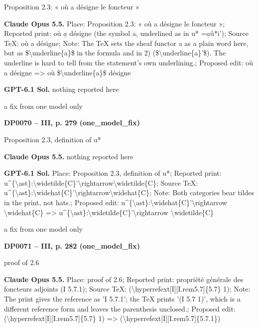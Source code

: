 Proposition 2.3: « où a désigne le foncteur »\par
\textbf{Claude Opus 5.5.} Place: Proposition 2.3: « où a désigne le foncteur »; Reported print: où \ensuremath{\underline{a}} désigne (the symbol a, underlined as in u* =\allowbreak  \ensuremath{\underline{a}}û*i'); Source TeX: où a désigne; Note: The TeX sets the sheaf functor a as a plain word here, but as \$\textbackslash{}underline\{a\}\$ in the formula and in 2) (\$\textbackslash{}underline\{a\}'\$). The underline is hard to tell from the statement's own underlining.; Proposed edit: où a désigne =\allowbreak > où \$\textbackslash{}underline\{a\}\$ désigne\par
\textbf{GPT-6.1 Sol.} nothing reported here\par
a fix from one model only\par
\par\noindent\hypertarget{DP0070}{}\textbf{DP0070 -- III, p. 279 (one\_model\_fix)}\par
Proposition 2.3, definition of u*\par
\textbf{Claude Opus 5.5.} nothing reported here\par
\textbf{GPT-6.1 Sol.} Place: Proposition 2.3, definition of u*; Reported print: u\textasciicircum{}\{\textbackslash{}ast\}:\textbackslash{}widetilde\{C\}'\textbackslash{}rightarrow\textbackslash{}widetilde\{C\}; Source TeX: u\textasciicircum{}\{\textbackslash{}ast\}:\textbackslash{}widehat\{C\}'\textbackslash{}rightarrow\textbackslash{}widehat\{C\}; Note: Both categories bear tildes in the print, not hats.; Proposed edit: u\textasciicircum{}\{\textbackslash{}ast\}:\textbackslash{}widehat\{C\}'\textbackslash{}rightarrow \textbackslash{}widehat\{C\} =\allowbreak > u\textasciicircum{}\{\textbackslash{}ast\}:\textbackslash{}widetilde\{C\}'\textbackslash{}rightarrow \textbackslash{}widetilde\{C\}\par
a fix from one model only\par
\par\noindent\hypertarget{DP0071}{}\textbf{DP0071 -- III, p. 282 (one\_model\_fix)}\par
proof of 2.6\par
\textbf{Claude Opus 5.5.} Place: proof of 2.6; Reported print: propriété générale des foncteurs adjoints (I 5.7.1); Source TeX: (\textbackslash{}hyperrefext[I][I.rem5.7]\{5.7\} 1); Note: The print gives the reference as 'I 5.7.1'; the TeX prints '(I 5.7 1)', which is a different reference form and leaves the parenthesis unclosed.; Proposed edit: (\textbackslash{}hyperrefext[I][I.rem5.7]\{5.7\} 1) =\allowbreak > (\textbackslash{}hyperrefext[I][I.rem5.7]\{5.7.1\})\par
